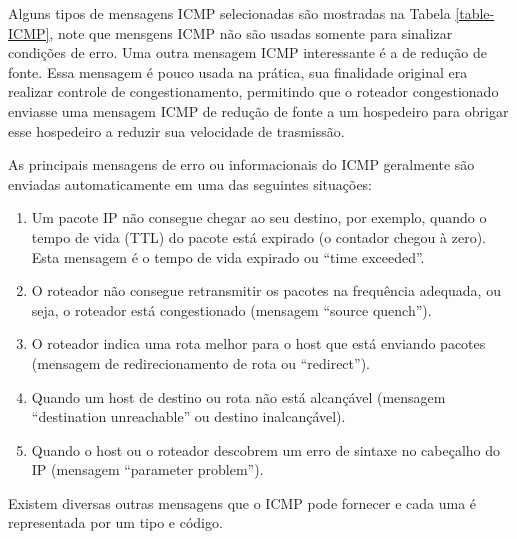 \documentclass[
	article,			%
	11pt,				%
	oneside,			%
	a4paper,			%
	english,			%
	brazil,				%
	sumario=tradicional
	]{abntex2}
\begin{document}
 Alguns tipos de mensagens ICMP selecionadas são mostradas na Tabela \ref{table-ICMP}, note que mensgens ICMP não são usadas somente para sinalizar condições de erro.
 Uma outra mensagem ICMP interessante é a de redução de fonte. Essa mensagem é pouco usada na prática, sua finalidade original era realizar controle de congestionamento, permitindo que o roteador congestionado enviasse uma mensagem ICMP de redução de fonte a um hospedeiro para obrigar esse hospedeiro a reduzir sua velocidade de trasmissão.
 
 As principais mensagens de erro ou informacionais do ICMP geralmente são enviadas automaticamente em uma das seguintes situações:
 \begin{enumerate}
 	\item Um pacote IP não consegue chegar ao seu destino, por exemplo, quando o tempo de vida (TTL) do pacote está expirado (o contador chegou à zero). Esta mensagem é o tempo de vida expirado ou “time exceeded”.
 	
 	\item O roteador não consegue retransmitir os pacotes na frequência adequada, ou seja, o roteador está congestionado (mensagem “source quench”).
 	
 	\item O roteador indica uma rota melhor para o host que está enviando pacotes (mensagem de redirecionamento de rota ou “redirect”).
 	
 	\item Quando um host de destino ou rota não está alcançável (mensagem “destination unreachable” ou destino inalcançável).
 	
 	\item Quando o host ou o roteador descobrem um erro de sintaxe no cabeçalho do IP (mensagem “parameter problem”). 
 \end{enumerate}
	Existem diversas outras mensagens que o ICMP pode fornecer e cada uma é representada por um tipo e código.\cite{dltec}
\end{document}
